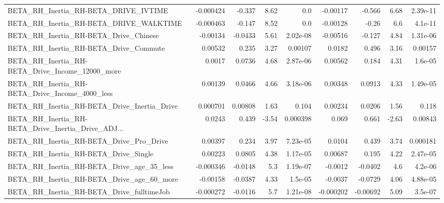 \begin{tabular}{lrrrrrrrr}
BETA\_RH\_Inertia\_RH-BETA\_DRIVE\_IVTIME               &   -0.000424 &       -0.337 &     8.62 &      0.0 &   -0.00117 &      -0.566 &         6.68 &      2.39e-11 \\
BETA\_RH\_Inertia\_RH-BETA\_DRIVE\_WALKTIME             &   -0.000463 &       -0.147 &     8.52 &      0.0 &   -0.00128 &       -0.26 &          6.6 &       4.1e-11 \\
BETA\_RH\_Inertia\_RH-BETA\_Drive\_Chinese              &    -0.00134 &      -0.0433 &     5.61 & 2.02e-08 &   -0.00516 &      -0.127 &         4.84 &      1.31e-06 \\
BETA\_RH\_Inertia\_RH-BETA\_Drive\_Commute              &     0.00532 &        0.235 &     3.27 &  0.00107 &     0.0182 &       0.496 &         3.16 &       0.00157 \\
BETA\_RH\_Inertia\_RH-BETA\_Drive\_Income\_12000\_more    &      0.0017 &       0.0736 &     4.68 & 2.87e-06 &    0.00562 &       0.184 &         4.31 &       1.6e-05 \\
BETA\_RH\_Inertia\_RH-BETA\_Drive\_Income\_4000\_less     &     0.00139 &       0.0466 &     4.66 & 3.18e-06 &    0.00348 &      0.0913 &         4.33 &      1.49e-05 \\
BETA\_RH\_Inertia\_RH-BETA\_Drive\_Inertia\_Drive        &    0.000701 &      0.00808 &     1.63 &    0.104 &    0.00234 &      0.0206 &         1.56 &         0.118 \\
BETA\_RH\_Inertia\_RH-BETA\_Drive\_Inertia\_Drive\_ADJ... &      0.0243 &        0.439 &    -3.54 & 0.000398 &      0.069 &       0.661 &        -2.63 &       0.00843 \\
BETA\_RH\_Inertia\_RH-BETA\_Drive\_Pro\_Drive            &     0.00397 &        0.234 &     3.97 & 7.23e-05 &     0.0104 &       0.439 &         3.74 &      0.000181 \\
BETA\_RH\_Inertia\_RH-BETA\_Drive\_Single               &     0.00223 &       0.0805 &     4.38 & 1.17e-05 &    0.00687 &       0.195 &         4.22 &      2.47e-05 \\
BETA\_RH\_Inertia\_RH-BETA\_Drive\_age\_35\_less          &   -0.000346 &      -0.0148 &      5.3 & 1.19e-07 &    -0.0012 &     -0.0402 &          4.6 &       4.2e-06 \\
BETA\_RH\_Inertia\_RH-BETA\_Drive\_age\_60\_more          &    -0.00158 &      -0.0387 &     4.33 &  1.5e-05 &    -0.0037 &     -0.0729 &         4.06 &      4.88e-05 \\
BETA\_RH\_Inertia\_RH-BETA\_Drive\_fulltimeJob          &   -0.000272 &      -0.0116 &      5.7 & 1.21e-08 &  -0.000202 &    -0.00692 &         5.09 &       3.5e-07 \\

\end{tabular}
